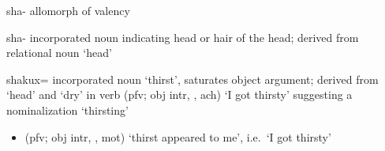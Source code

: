 \begin{morphdesc}[resume*=alphalist]
\item[sha-]\label{m:sha-val}
	allomorph of valency 

\item[sha-]\label{m:sha-head}
	incorporated noun indicating head or hair of the head;
	derived from relational noun  ‘head’

\item[shakux=]
	incorporated noun ‘thirst’,
	saturates object argument;
	derived from  ‘head’ and  ‘dry’
		in verb  (pfv; obj intr, , ach) ‘I got thirsty’
		suggesting a nominalization  ‘thirsting’
	\begin{itemize}
	\item	{} (pfv; obj intr, , mot) ‘thirst appeared to me’,
		i.e.\ ‘I got thirsty’
		\parencite[01/11]{leer:1973}
	\end{itemize}


\end{morphdesc}
